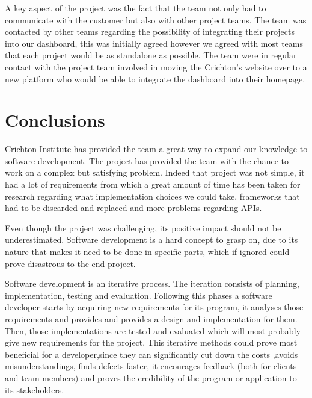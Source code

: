 \documentclass{l3proj}
\begin{document}
A key aspect of the project was the fact that the team not only had to communicate with the customer but also with
other project teams. The team was contacted by other teams regarding the possibility of integrating their projects into
our dashboard, this was initially agreed however we agreed with most teams that each project would be as standalone as
possible. The team were in regular contact with the project team involved in moving the Crichton's website over to a
new platform who would be able to integrate the dashboard into their homepage.


\section{Conclusions}
\label{sec:conclusions}


Crichton Institute has provided the team a great way to expand our knowledge to software development. The project has
provided the team with the chance to work on a complex but satisfying problem. Indeed that project was not simple,
it had a lot of requirements from which a great amount of time has been taken for research regarding what implementation
choices we could take, frameworks that had to be discarded and replaced and more problems regarding APIs.

Even though the project was challenging, its positive impact should not be underestimated. Software development is a hard
concept to grasp on, due to its  nature that makes it need to be done in specific parts, which if ignored could prove
disastrous to the end project.

Software development is an iterative process. The iteration consists of planning, implementation, testing and evaluation.
Following this phases a software developer  starts by acquiring new requirements for its program, it analyses those
requirements and provides and provides a design and implementation for them. Then, those implementations are tested and
evaluated which will most probably give new requirements for the project. This iterative methods could prove most
beneficial for a developer,since they can significantly cut down the costs ,avoids misunderstandings, finds defects
faster, it encourages feedback (both for clients and team members) and proves the credibility of the program or
application to its stakeholders.
\end{document}
